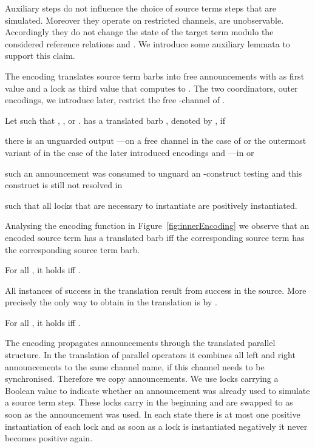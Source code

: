 \documentclass[copyright,creativecommons]{eptcs}
\begin{document}
Auxiliary steps do not influence the choice of source terms steps that are simulated. Moreover they operate on restricted channels, \ie are unobservable. Accordingly they do not change the state of the target term modulo the considered reference relations  and . We introduce some auxiliary lemmata to support this claim.

The encoding  translates source term barbs  into free announcements with  as first value and a lock  as third value that computes to . The two coordinators, \ie outer encodings, we introduce later, restrict the free -channel of .

\begin{definition}
	Let  such that , , or .
	 has a translated barb , denoted by , if
	\begin{compactitem}
		\item there is an unguarded output ---on a free channel  in the case of  or the outermost variant of  in the case of the later introduced encodings  and ---in  or
		\item such an announcement was consumed to unguard an -construct testing  and this construct is still not resolved in 
	\end{compactitem}
	such that all locks that are necessary to instantiate  are positively instantiated.
\end{definition}

Analysing the encoding function in Figure~\ref{fig:innerEncoding} we observe that an encoded source term has a translated barb iff the corresponding source term has the corresponding source term barb.

\begin{obs}
	For all , it holds  iff .
	\label{obs:transBarbs}
\end{obs}

All instances of success in the translation result from success in the source. More precisely the only way to obtain  in the translation is by .

\begin{obs}
	For all , it holds  iff .
	\label{obs:success}
\end{obs}

The encoding propagates announcements through the translated parallel structure. In the translation of parallel operators it combines all left and right announcements \wrt to the same channel name, if this channel needs to be synchronised. Therefore we copy announcements.
We use locks carrying a Boolean value to indicate whether an announcement was already used to simulate a source term step. These locks carry  in the beginning and are swapped to  as soon as the announcement was used. In each state there is at most one positive instantiation of each lock and as soon as a lock is instantiated negatively it never becomes positive again.
\end{document}

